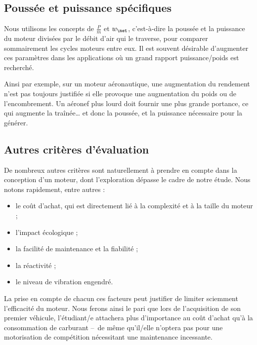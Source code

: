 	\subsection{Poussée et puissance spécifiques}
	\label{ch_poussee_puissance_specifiques}

		Nous utilisons les concepts de  $\frac{P}{\dot m}$ et  $w_\net$, c’est-à-dire la poussée et la puissance du moteur divisées par le débit d’air qui le traverse, pour comparer sommairement les cycles moteurs entre eux. Il est souvent désirable d’augmenter ces paramètres dans les applications où un grand rapport puissance/poids est recherché.

		Ainsi par exemple, sur un moteur aéronautique, une augmentation du rendement n’est pas toujours justifiée si elle provoque une augmentation du poids ou de l’encombrement. Un aéronef plus lourd doit fournir une plus grande portance, ce qui augmente la traînée… et donc la poussée, et la puissance nécessaire pour la générer.

	
	\subsection{Autres critères d’évaluation}
	
		De nombreux autres critères sont naturellement à prendre en compte dans la conception d’un moteur, dont l’exploration dépasse le cadre de notre étude. Nous notons rapidement, entre autres :
		
		\begin{itemize}
			\item le coût d’achat, qui est directement lié à la complexité et à la taille du moteur ;
			\item l’impact écologique ;
			\item la facilité de maintenance et la fiabilité ;
			\item la réactivité ;
			\item le niveau de vibration engendré.
		\end{itemize}

		La prise en compte de chacun ces facteurs peut justifier de limiter sciemment l’efficacité du moteur. Nous ferons ainsi le pari que lors de l’acquisition de son premier véhicule, l’étudiant/e attachera plus d’importance au coût d’achat qu’à la consommation de carburant --\ de même qu’il/\-elle n’optera pas pour une motorisation de compétition nécessitant une maintenance incessante.
		
